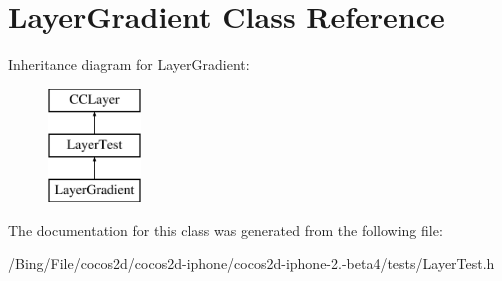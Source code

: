 \hypertarget{interface_layer_gradient}{\section{Layer\-Gradient Class Reference}
\label{interface_layer_gradient}
}
Inheritance diagram for Layer\-Gradient\-:\begin{figure}[H]
\begin{center}
\leavevmode
\includegraphics[height=3.000000cm]{interface_layer_gradient}
\end{center}
\end{figure}


The documentation for this class was generated from the following file\-:\begin{DoxyCompactItemize}
\item 
/\-Bing/\-File/cocos2d/cocos2d-\/iphone/cocos2d-\/iphone-\/2.-\/beta4/tests/Layer\-Test.\-h\end{DoxyCompactItemize}
